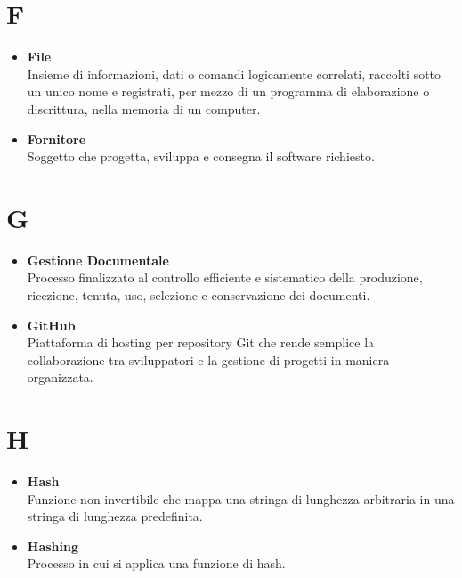 \documentclass[a4paper,12pt]{article}
\begin{document}
        \section*{F} {
            \begin{itemize}
                \item \textbf{File}\\
                    Insieme di informazioni, dati o comandi logicamente correlati, raccolti sotto un unico nome e registrati, per mezzo di un programma di elaborazione o discrittura, nella memoria di un computer.
                \item \textbf{Fornitore}\\
                    Soggetto che progetta, sviluppa e consegna il software richiesto.
            \end{itemize}
        }
        \newpage

        \section*{G} {
            \begin{itemize}
                \item \textbf{Gestione Documentale}\\
                    Processo finalizzato al controllo efficiente e sistematico della produzione, ricezione, tenuta, uso, selezione e conservazione dei documenti.
                \item \textbf{GitHub}\\
                    Piattaforma di hosting per repository Git che rende semplice la collaborazione tra sviluppatori e la gestione di progetti in maniera organizzata.
            \end{itemize}
        }
        \newpage

        \section*{H} {
            \begin{itemize}
                \item \textbf{Hash}\\
                    Funzione non invertibile che mappa una stringa di lunghezza arbitraria in una stringa di lunghezza predefinita.
                \item \textbf{Hashing}\\
                    Processo in cui si applica una funzione di hash.
            \end{itemize}
        }
        \newpage
\end{document}
